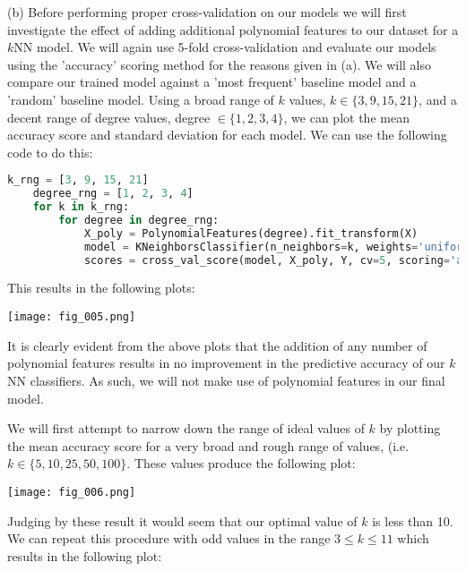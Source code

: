 \documentclass[12pt]{article}
\begin{document}
\noindent (b) Before performing proper cross-validation on our models we will first investigate the effect of adding additional polynomial features to our dataset for a $k$NN model. We will again use 5-fold cross-validation and evaluate our models using the 'accuracy' scoring method for the reasons given in (a). We will also compare our trained model against a 'most frequent' baseline model and a 'random' baseline model. Using a broad range of $k$ values, $k \in \{3, 9, 15, 21\}$, and a decent range of degree values, degree $\in \{1, 2, 3, 4\}$, we can plot the mean accuracy score and standard deviation for each model. We can use the following code to do this:

\begin{center}
    \lstset{basicstyle=\footnotesize}
    \begin{lstlisting}[language=Python]
    k_rng = [3, 9, 15, 21]
    degree_rng = [1, 2, 3, 4]
    for k in k_rng:
        for degree in degree_rng:
            X_poly = PolynomialFeatures(degree).fit_transform(X)
            model = KNeighborsClassifier(n_neighbors=k, weights='uniform').fit(X_poly, Y)
            scores = cross_val_score(model, X_poly, Y, cv=5, scoring='accuracy')
    \end{lstlisting}
\end{center}

This results in the following plots:

\begin{center}
    \texttt{[image: fig\_005.png]}
\end{center}

It is clearly evident from the above plots that the addition of any number of polynomial features results in no improvement in the predictive accuracy of our $k$NN classifiers. As such, we will not make use of polynomial features in our final model.

We will first attempt to narrow down the range of ideal values of $k$ by plotting the mean accuracy score for a very broad and rough range of values, (i.e. $k \in \{5, 10, 25, 50, 100\}$. These values produce the following plot:

\begin{center}
    \texttt{[image: fig\_006.png]}
\end{center}

Judging by these result it would seem that our optimal value of $k$ is less than 10. We can repeat this procedure with odd values in the range $3 \le k \le 11$ which results in the following plot:
\end{document}
